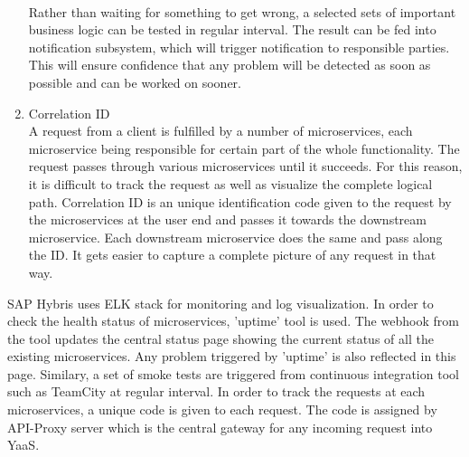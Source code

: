 \begin{enumerate}
\\
Rather than waiting for something to get wrong, a selected sets of important business logic can be tested in regular interval. The result can be fed into notification subsystem, which will trigger notification to responsible parties. This will ensure confidence that any problem will be detected as soon as possible and can be worked on sooner. \cite{Simone:2014aa} \cite{Newman:2015aa}
\item Correlation ID \\
A request from a client is fulfilled by a number of microservices, each microservice being responsible for certain part of the whole functionality. The request passes through various microservices until it succeeds. For this reason, it is difficult to track the request as well as visualize the complete logical path. Correlation ID is an unique identification code given to the request by the microservices at the user end and passes it towards the downstream microservice. Each downstream microservice does the same and pass along the ID. It gets easier to capture a complete picture of any request in that way.
\end{enumerate}
\begin{shaded}
SAP Hybris uses ELK stack for monitoring and log visualization. In order to check the health status of microservices, 'uptime' tool is used. The webhook from the tool updates the central status page showing the current status of all the existing microservices. Any problem triggered by 'uptime' is also reflected in this page. Similary, a set of smoke tests are triggered from continuous integration tool such as TeamCity at regular interval. In order to track the requests at each microservices, a unique code is given to each request. The code is assigned by API-Proxy server which is the central gateway for any incoming request into \acrshort{YaaS}.
\end{shaded}

